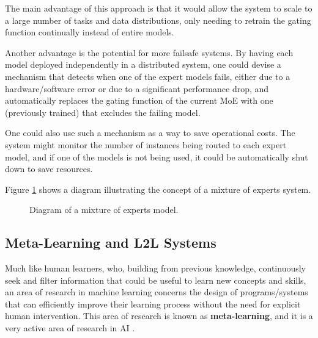 \documentclass[../main.tex]{subfiles}
\begin{document}
    The main advantage of this approach is that it would allow the system to scale to a large number of tasks and data distributions, only needing to retrain the gating function continually instead of entire models. 
    
    Another advantage is the potential for more failsafe systems. By having each model deployed independently in a distributed system, one could devise a mechanism that detects when one of the expert models fails, either due to a hardware/software error or due to a significant performance drop, and automatically replaces the gating function of the current MoE with one (previously trained) that excludes the failing model.
    
    One could also use such a mechanism as a way to save operational costs. The system might monitor the number of instances being routed to each expert model, and if one of the models is not being used, it could be automatically shut down to save resources.

    Figure \ref{fig:moes} shows a diagram illustrating the concept of a mixture of experts system.

    \begin{figure}[H]
        \centering
        \caption{Diagram of a mixture of experts model.}
        \resizebox*{0.8\linewidth}{!}{
            
        }
        \label{fig:moes}
    \end{figure}

  
    \subsection{Meta-Learning and L2L Systems} \label{conclusions:research_directions:l2l} 

    Much like human learners, who, building from previous knowledge, continuously seek and filter information that could be useful to learn new concepts and skills, an area of research in machine learning concerns the design of programs/systems that can efficiently improve their learning process without the need for explicit human intervention. This area of research is known as \textbf{meta-learning}, and it is a very active area of research in AI .
    
\end{document}
